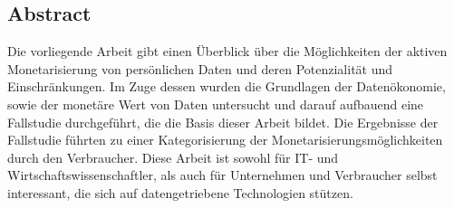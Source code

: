 \thispagestyle{empty}
\vspace*{5cm}
\begin{center}
\begin{minipage}{0.9\textwidth}
\chapter*{Abstract}

Die vorliegende Arbeit gibt einen Überblick über die Möglichkeiten der aktiven Monetarisierung von persönlichen Daten und deren Potenzialität und Einschränkungen. Im Zuge dessen wurden die Grundlagen der Datenökonomie, sowie der monetäre Wert von Daten untersucht und darauf aufbauend eine Fallstudie durchgeführt, die die Basis dieser Arbeit bildet. Die Ergebnisse der Fallstudie führten zu einer Kategorisierung der Monetarisierungsmöglichkeiten durch den Verbraucher. Diese Arbeit ist sowohl für IT- und Wirtschaftswissenschaftler, als auch für Unternehmen und Verbraucher selbst interessant, die sich auf datengetriebene Technologien stützen.

\vspace*{1.5cm}
\end{minipage}
\end{center}
\clearpage